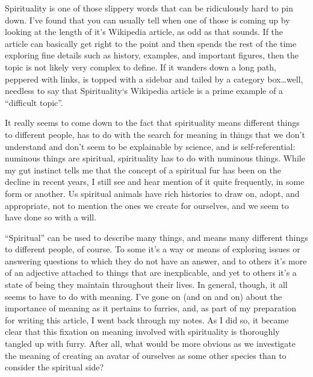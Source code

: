 
Spirituality is one of those slippery words that can be ridiculously hard to pin down.   I've found that you can usually tell when one of those is coming up by looking at the length of it's Wikipedia article, as odd as that sounds.  If the article can basically get right to the point and then spends the rest of the time exploring fine details such as history, examples, and important figures, then the topic is not likely very complex to define.  If it wanders down a long path, peppered with links, is topped with a sidebar and tailed by a category box…well, needless to say that Spirituality`s Wikipedia article is a prime example of a ``difficult topic''.

It really seems to come down to the fact that spirituality means different things to different people, has to do with the search for meaning in things that we don't understand and don't seem to be explainable by science, and is self-referential: numinous things are spiritual, spirituality has to do with numinous things.  While my gut instinct tells me that the concept of a spiritual fur has been on the decline in recent years, I still see and hear mention of it quite frequently, in some form or another.  Us spiritual animals have rich histories to draw on, adopt, and appropriate, not to mention the ones we create for ourselves, and we seem to have done so with a will.

``Spiritual'' can be used to describe many things, and means many different things to different people, of course.  To some it's a way or means of exploring issues or answering questions to which they do not have an answer, and to others it's more of an adjective attached to things that are inexplicable, and yet to others it's a state of being they maintain throughout their lives.  In general, though, it all seems to have to do with meaning.  I've gone on (and on and on) about the importance of meaning as it pertains to furries, and, as part of my preparation for writing this article, I went back through my notes.  As I did so, it became clear that this fixation on meaning involved with spirituality is thoroughly tangled up with furry.  After all, what would be more obvious as we investigate the meaning of creating an avatar of ourselves as some other species than to consider the spiritual side?

